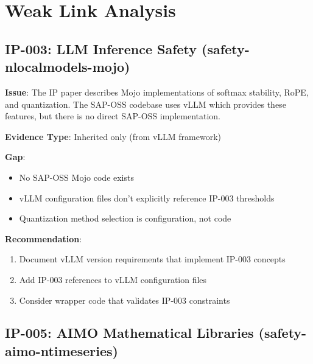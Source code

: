 \section{Weak Link Analysis}

\subsection{IP-003: LLM Inference Safety (safety-nlocalmodels-mojo)}

\begin{tcolorbox}[colback=red!5,colframe=red!70,title=\faIcon{exclamation-triangle} Weak Traceability: IP-003]
\textbf{Issue}: The IP paper describes Mojo implementations of softmax stability, RoPE, and quantization. The SAP-OSS codebase uses vLLM which provides these features, but there is no direct SAP-OSS implementation.

\textbf{Evidence Type}: Inherited only (from vLLM framework)

\textbf{Gap}: 
\begin{itemize}[nosep]
    \item No SAP-OSS Mojo code exists
    \item vLLM configuration files don't explicitly reference IP-003 thresholds
    \item Quantization method selection is configuration, not code
\end{itemize}

\textbf{Recommendation}: 
\begin{enumerate}[nosep]
    \item Document vLLM version requirements that implement IP-003 concepts
    \item Add IP-003 references to vLLM configuration files
    \item Consider wrapper code that validates IP-003 constraints
\end{enumerate}
\end{tcolorbox}

\subsection{IP-005: AIMO Mathematical Libraries (safety-aimo-ntimeseries)}

